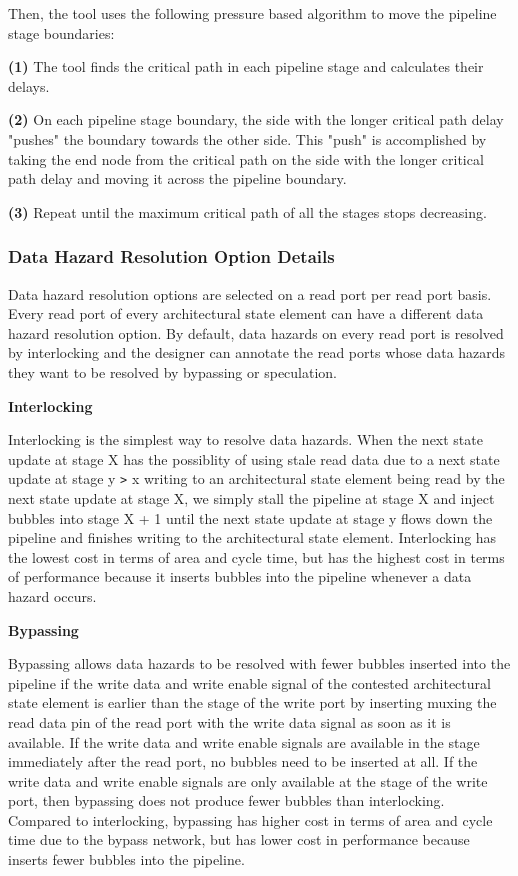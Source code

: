 Then, the tool uses the following pressure based algorithm to move the pipeline stage boundaries:

{\bf (1)} The tool finds the critical path in each pipeline stage and calculates their delays.

{\bf (2)} On each pipeline stage boundary, the side with the longer critical path delay "pushes" the boundary towards the other side. This "push" is accomplished by taking the end node from the critical path on the side with the longer critical path delay and moving it across the pipeline boundary.

{\bf (3)} Repeat until the maximum critical path of all the stages stops decreasing.

\subsubsection{Data Hazard Resolution Option Details}
\label{section:logicGen}
Data hazard resolution options are selected on a read port per read port basis. Every read port of every architectural state element can have a different data hazard resolution option. By default, data hazards on every read port is resolved by interlocking and the designer can annotate the read ports whose data hazards they want to be resolved by bypassing or speculation.

{\bf Interlocking}

Interlocking is the simplest way to resolve data hazards. When the next state update at stage X has the possiblity of using stale read data due to a next state update at stage y {\tt >} x writing to an architectural state element being read by the next state update at stage X, we simply stall the pipeline at stage X and inject bubbles into stage X + 1 until the next state update at stage y flows down the pipeline and finishes writing to the architectural state element. Interlocking has the lowest cost in terms of area and cycle time, but has the highest cost in terms of performance because it inserts bubbles into the pipeline whenever a data hazard occurs.

{\bf Bypassing}

Bypassing allows data hazards to be resolved with fewer bubbles inserted into the pipeline if the write data and write enable signal of the contested architectural state element is earlier than the stage of the write port by inserting muxing the read data pin of the read port with the write data signal as soon as it is available. If the write data and write enable signals are available in the stage immediately after the read port, no bubbles need to be inserted at all. If the write data and write enable signals are only available at the stage of the write port, then bypassing does not produce fewer bubbles than interlocking. Compared to interlocking, bypassing has higher cost in terms of area and cycle time due to the bypass network, but has lower cost in performance because inserts fewer bubbles into the pipeline.

